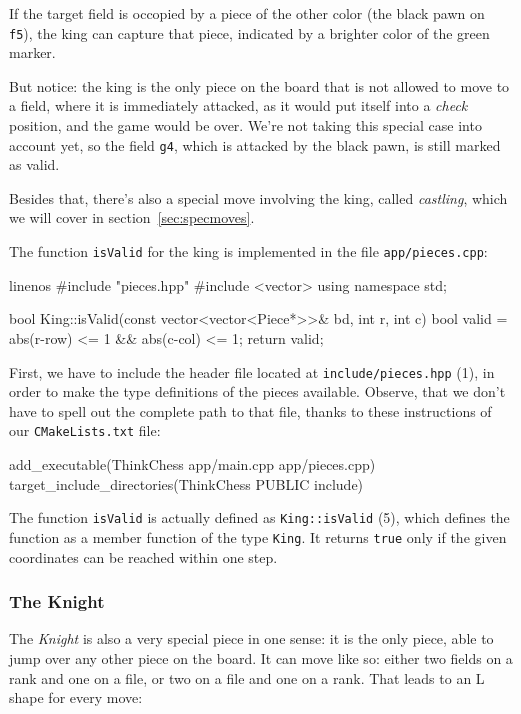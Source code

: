 If the target field is occopied by a piece of the other color (the black pawn on \texttt{f5}),
the king can capture that piece, indicated by a brighter color of the green marker.

But notice: the king is the only piece on the board that is not allowed to move to a field,
where it is immediately attacked, as it would put
itself into a \emph{check} position, and the game would be over.
We're not taking this special case into account yet, so the field \texttt{g4},
which is attacked by the black pawn, is still marked as valid.

Besides that, there's also a special move involving the king, called \emph{castling},
which we will cover in section~\ref{sec:specmoves}.

The function \texttt{isValid} for the king is implemented in the file
\texttt{app/pieces.cpp}:

\begin{cpp*}{linenos}
#include "pieces.hpp"
#include <vector>
using namespace std;

bool King::isValid(const vector<vector<Piece*>>& bd, int r, int c) {
  bool valid = abs(r-row) <= 1 && abs(c-col) <= 1;
  return valid;
}
\end{cpp*}

First, we have to include the header file located at \texttt{include/pieces.hpp} (1),
in order to make the type definitions of the pieces available.
Observe, that we don't have to spell out the complete path to that file, thanks to these
instructions of our \texttt{CMakeLists.txt} file:

\begin{cpp}
add_executable(ThinkChess app/main.cpp app/pieces.cpp)
target_include_directories(ThinkChess PUBLIC include)
\end{cpp}

The function \texttt{isValid} is actually defined as
\texttt{King::isValid} (5), which defines the function as a member function of the
type \texttt{King}.
It returns \texttt{true} only if the given coordinates can be reached within one step.

\subsubsection{The Knight}
The \emph{Knight} is also a very special piece in one sense: it is the only piece, able to
jump over any other piece on the board.
It can move like so: either two fields on a rank and one on a file, or two on a file and one on
a rank.
That leads to an L shape for every move:

